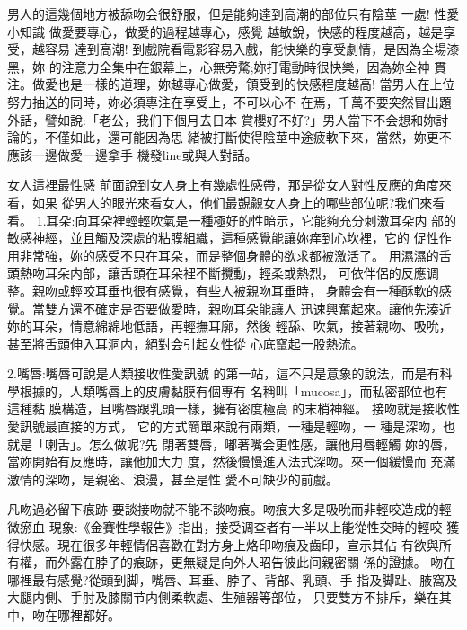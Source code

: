 \documentclass[12pt,UTF8]{ctexbook}
\begin{document}
男人的這幾個地方被舔吻会很舒服，但是能夠達到高潮的部位只有陰莖
一處!
性愛小知識
做愛要專心，做愛的過程越專心，感覺
越敏銳，快感的程度越高，越是享受，越容易
達到高潮!
到戲院看電影容易入戲，能快樂的享受劇情，是因為全場漆黑，妳
的注意力全集中在銀幕上，心無旁騖;妳打電動時很快樂，因為妳全神
貫注。做愛也是一樣的道理，妳越專心做愛，領受到的快感程度越高!
當男人在上位努力抽送的同時，妳必須專注在享受上，不可以心不
在焉，千萬不要突然冒出題外話，譬如說:「老公，我们下個月去日本
賞櫻好不好?」男人當下不会想和妳討論的，不僅如此，還可能因為思
緒被打斷使得陰莖中途疲軟下來，當然，妳更不應該一邊做愛一邊拿手
機發line或與人對話。

女人這裡最性感
前面說到女人身上有幾處性感帶，那是從女人對性反應的角度來看，如果
從男人的眼光來看女人，他们最覬覦女人身上的哪些部位呢?我们來看看。
1.耳朵:向耳朵裡輕輕吹氣是一種極好的性暗示，它能夠充分刺激耳朵内
部的敏感神經，並且觸及深處的粘膜組織，這種感覺能讓妳痒到心坎裡，它的
促性作用非常強，妳的感受不只在耳朵，而是整個身體的欲求都被激活了。
用濕濕的舌頭熱吻耳朵内部，讓舌頭在耳朵裡不斷攪動，輕柔或熱烈，
可依伴侶的反應调整。親吻或輕咬耳垂也很有感覺，有些人被親吻耳垂時，
身體会有一種酥軟的感覺。當雙方還不確定是否要做愛時，親吻耳朵能讓人
迅速興奮起來。讓他先湊近妳的耳朵，情意綿綿地低語，再輕撫耳廓，然後
輕舔、吹氣，接著親吻、吸吮，甚至將舌頭伸入耳洞内，絕對会引起女性從
心底竄起一股熱流。

2.嘴唇:嘴唇可說是人類接收性愛訊號
的第一站，這不只是意象的說法，而是有科
學根據的，人類嘴唇上的皮膚黏膜有個專有
名稱叫「mucosa」，而私密部位也有這種黏
膜構造，且嘴唇跟乳頭一樣，擁有密度極高
的末梢神經。
接吻就是接收性愛訊號最直接的方式，
它的方式簡單來說有兩類，一種是輕吻，一
種是深吻，也就是「喇舌」。怎么做呢?先
閉著雙唇，嘟著嘴会更性感，讓他用唇輕觸
妳的唇，當妳開始有反應時，讓他加大力
度，然後慢慢進入法式深吻。來一個緩慢而
充滿激情的深吻，是親密、浪漫，甚至是性
愛不可缺少的前戲。

凡吻過必留下痕跡
要談接吻就不能不談吻痕。吻痕大多是吸吮而非輕咬造成的輕微瘀血
現象:《金賽性學報告》指出，接受调查者有一半以上能從性交時的輕咬
獲得快感。現在很多年輕情侶喜歡在對方身上烙印吻痕及齒印，宣示其佔
有欲與所有權，而外露在脖子的痕跡，更無疑是向外人昭告彼此间親密關
係的證據。
吻在哪裡最有感覺?從頭到脚，嘴唇、耳垂、脖子、背部、乳頭、手
指及脚趾、腋窩及大腿内側、手肘及膝關节内側柔軟處、生殖器等部位，
只要雙方不排斥，樂在其中，吻在哪裡都好。
\end{document}
